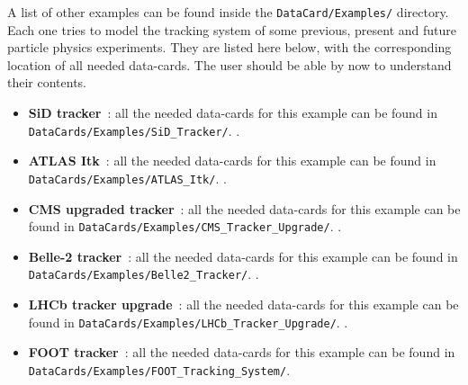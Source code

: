 A list of other examples can be found inside the {\tt DataCard/Examples/} directory. Each one tries to model the tracking system of some previous, present and 
future particle physics experiments. They are listed here below, with the corresponding location of all needed data-cards. The user should be able by now to understand 
their contents. 

\begin{itemize}
 \item  {\bf SiD tracker}~\cite{bib:SiDcoll}: all the needed data-cards for this example can be found in {\tt DataCards/Examples/SiD\_Tracker/}. {\todo}.
 
 \item  {\bf ATLAS Itk}~\cite{bib:ATLASItk}: all the needed data-cards for this example can be found in {\tt DataCards/Examples/ATLAS\_Itk/}. {\todo}.
 
 \item  {\bf CMS upgraded tracker}~\cite{bib:CMSTrackerUpgrade}: all the needed data-cards for this example can be found in {\tt DataCards/Examples/CMS\_Tracker\_Upgrade/}. {\todo}.
 
 \item  {\bf Belle-2 tracker}~\cite{bib:BelleIIcoll}: all the needed data-cards for this example can be found in {\tt DataCards/Examples/Belle2\_Tracker/}. {\todo}.
 
 \item  {\bf LHCb tracker upgrade}~\cite{bib:LHCb_tracker_upgrade}: all the needed data-cards for this example can be found in {\tt DataCards/Examples/LHCb\_Tracker\_Upgrade/}. {\todo}.
 
 \item  {\bf FOOT tracker}~\cite{bib:FOOT_tracker}: all the needed data-cards for this example can be found in {\tt DataCards/Examples/FOOT\_Tracking\_System/}.
\end{itemize}





